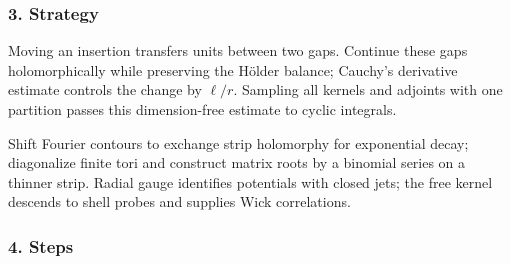 \documentclass[
  letterpaper,
  11pt]{article}
\begin{document}
\subsubsection{3. Strategy}\label{strategy-18}

Moving an insertion transfers units between two gaps. Continue these
gaps holomorphically while preserving the Hölder balance; Cauchy's
derivative estimate controls the change by \(\ell/r\). Sampling all
kernels and adjoints with one partition passes this dimension-free
estimate to cyclic integrals.

Shift Fourier contours to exchange strip holomorphy for exponential
decay; diagonalize finite tori and construct matrix roots by a binomial
series on a thinner strip. Radial gauge identifies potentials with
closed jets; the free kernel descends to shell probes and supplies Wick
correlations.

\subsubsection{4. Steps}\label{steps-18}
\end{document}
